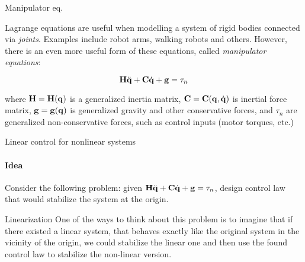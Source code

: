 \documentclass{beamer}
\begin{document}
\begin{frame}{Manipulator eq.}
\begin{flushleft}

Lagrange equations are useful when modelling a system of rigid bodies connected via \emph{joints}. Examples include robot arms, walking robots and others. However, there is an even more useful form of these equations, called \emph{manipulator equations}:

\begin{equation}
    \mathbf{H} \ddot{\mathbf{q}} + \mathbf{C} \dot{\mathbf{q}} + \mathbf{g} = \tau_n
\end{equation}

where $\mathbf{H} = \mathbf{H}(\mathbf{q})$ is a generalized inertia matrix, $\mathbf{C} = \mathbf{C}(\mathbf{q}, \dot{\mathbf{q}})$ is inertial force matrix, $\mathbf{g} = \mathbf{g}(\mathbf{q})$ is generalized gravity and other conservative forces, and $\tau_n$ are generalized non-conservative forces, such as control inputs (motor torques, etc.)

\end{flushleft}
\end{frame}




\begin{frame}{Linear control for nonlinear systems}
\framesubtitle{Idea}
\begin{flushleft}

Consider the following problem: given $\mathbf{H} \ddot{\mathbf{q}} + \mathbf{C} \dot{\mathbf{q}} + \mathbf{g} = \tau_n$, design control law that would stabilize the system at the origin.

\bigskip

\begin{block}{Linearization}
One of the ways to think about this problem is to imagine that if there existed a linear system, that behaves exactly like the original system in the vicinity of the origin, we could stabilize the linear one and then use the found control law to stabilize the non-linear version.
\end{block}


\end{flushleft}
\end{frame}
\end{document}
